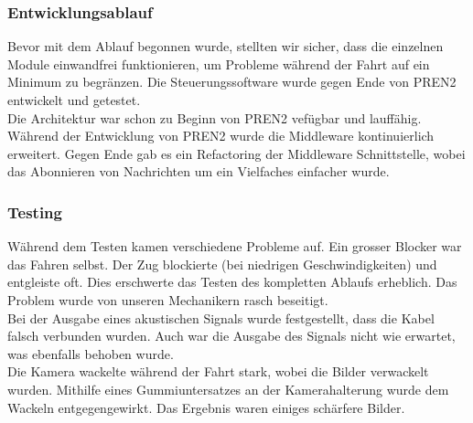 \documentclass[../../main.tex]{subfiles}
\begin{document}
\subsubsection{Entwicklungsablauf}
Bevor mit dem Ablauf begonnen wurde, stellten wir sicher, dass die einzelnen Module einwandfrei funktionieren, um Probleme während der Fahrt auf ein Minimum zu begränzen. Die Steuerungssoftware wurde gegen Ende von PREN2 entwickelt und getestet. \\

Die Architektur war schon zu Beginn von PREN2 vefügbar und lauffähig. Während der Entwicklung von PREN2 wurde die Middleware kontinuierlich erweitert. Gegen Ende gab es ein Refactoring der Middleware Schnittstelle, wobei das Abonnieren von Nachrichten um ein Vielfaches einfacher wurde.

\subsubsection{Testing}
Während dem Testen kamen verschiedene Probleme auf. Ein grosser Blocker war das Fahren selbst. Der Zug blockierte (bei niedrigen Geschwindigkeiten) und entgleiste oft. Dies erschwerte das Testen des kompletten Ablaufs erheblich. Das Problem wurde von unseren Mechanikern rasch beseitigt. \\

Bei der Ausgabe eines akustischen Signals wurde festgestellt, dass die Kabel falsch verbunden wurden. Auch war die Ausgabe des Signals nicht wie erwartet, was ebenfalls behoben wurde. \\

Die Kamera wackelte während der Fahrt stark, wobei die Bilder verwackelt wurden. Mithilfe eines Gummiuntersatzes an der Kamerahalterung wurde dem Wackeln entgegengewirkt. Das Ergebnis waren einiges schärfere Bilder.
\end{document}

